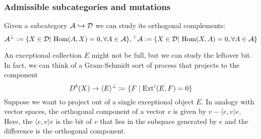 



\subsubsection{Admissible subcategories and mutations}

Given a subcategory $\mathcal{A} \hookrightarrow \mathcal{D}$ we can study its orthogonal complements: $$\mathcal{A}^\perp : = \{ X \in \mathcal{D}|\, \operatorname{Hom}(A,X)=0, \forall A\in \mathcal{A}\}, \prescript{\perp}{}{\mathcal{A}} : = \{ X \in \mathcal{D}|\, \operatorname{Hom}(X,A)=0, \forall A\in \mathcal{A}\}$$

An exceptional collection $E$ might not be full, but we can study the leftover bit. In fact, we can think of a Gram-Schmidt sort of process that projects to the component
\begin{equation*}
    D^b(X) \to \langle E\rangle^\perp \coloneqq \{F\mid\operatorname{Ext}^i(E,F)=0\}
\end{equation*}
Suppose we want to project out of a single exceptional object $E$. In analogy with vector spaces, the orthogonal component of a vector $v$ is given by $v-\langle e,v \rangle e$. Here, the $\langle e,v \rangle e$ is the bit of $v$ that lies in the subspace generated by $e$ and the difference is the orthogonal component.

